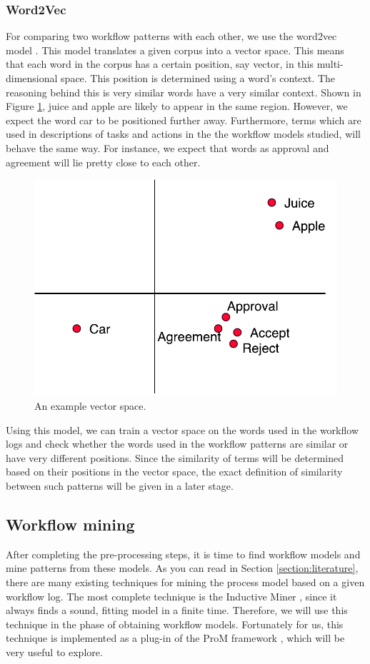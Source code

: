 \documentclass[a4paper,11pt]{article}
\begin{document}
\subsubsection{Word2Vec}
For comparing two workflow patterns with each other, we use the word2vec model \cite{Mikolov2013a,Mikolov2013b}. This model translates a given corpus into a vector space. This means that each word in the corpus has a certain position, say vector, in this multi-dimensional space. This position is determined using a word's context. The reasoning behind this is very similar words have a very similar context. Shown in Figure \ref{figure:word2vec_example}, juice and apple are likely to appear in the same region. However, we expect the word car to be positioned further away. Furthermore, terms which are used in descriptions of tasks and actions in the the workflow models studied, will behave the same way. For instance, we expect that words as approval and agreement will lie pretty close to each other. 

\begin{figure}[H]
\centering
\includegraphics[width=0.7\linewidth]{word2vec_example.pdf}
\caption{An example vector space.}
\label{figure:word2vec_example}
\end{figure}


Using this model, we can train a vector space on the words used in the workflow logs and check whether the words used in the workflow patterns are similar or have very different positions. Since the similarity of terms will be determined based on their positions in the vector space, the exact definition of similarity between such patterns will be given in a later stage. 

\subsection{Workflow mining}
After completing the pre-processing steps, it is time to find workflow models and mine patterns from these models. As you can read in Section \ref{section:literature}, there are many existing techniques for mining the process model based on a given workflow log. The most complete technique is the Inductive Miner \cite{InductiveMiner2013}, since it always finds a sound, fitting model in a finite time. Therefore, we will use this technique in the phase of obtaining workflow models. Fortunately for us, this technique is implemented as a plug-in of the ProM framework \cite{InductiveVisualMiner2014}, which will be very useful to explore.  
\end{document}
